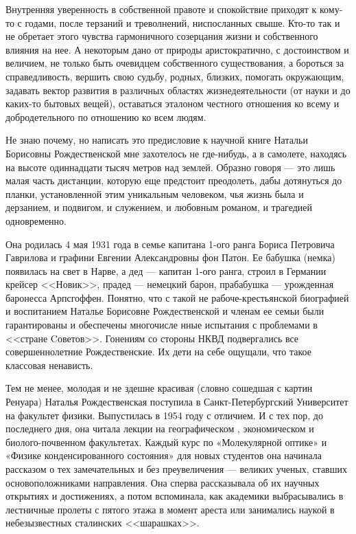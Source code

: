 ﻿\newpage
\vskip 10mm
\vskip 3mm 
\vskip 1cm

\pagestyle{empty}

\thispagestyle{empty}


Внутренняя уверенность в собственной правоте и спокойствие приходят к кому-то с годами, после терзаний и треволнений, ниспосланных свыше. Кто-то так и не обретает этого чувства гармоничного созерцания жизни и собственного влияния на нее. А некоторым дано от природы аристократично, с достоинством и величием, не только быть очевидцем собственного существования, а бороться за справедливость, вершить свою судьбу, родных, близких, помогать окружающим, задавать вектор развития в различных областях жизнедеятельности (от науки и до каких-то бытовых вещей), оставаться эталоном честного отношения ко всему и добродетельного по отношению ко всем людям.

Не знаю почему, но написать это предисловие к научной книге Натальи Борисовны Рождественской мне захотелось не где-нибудь, а в самолете, находясь на высоте одиннадцати тысяч метров над землей. Образно говоря --- это лишь малая часть дистанции, которую еще предстоит преодолеть, дабы дотянуться до планки, установленной этим уникальным человеком, чья жизнь была и дерзанием, и подвигом, и служением, и любовным романом, и трагедией одновременно.

Она родилась 4 мая 1931 года в семье капитана 1-ого ранга Бориса Петровича Гаврилова и графини Евгении Александровны фон Патон. Ее бабушка (немка) появилась на свет в Нарве, а дед --- капитан 1-ого ранга, строил в Германии крейсер <<Новик>>, прадед --- немецкий барон, прабабушка --- урожденная баронесса Арпсгоффен. Понятно, что с такой не рабоче-крестьянской биографией и воспитанием Наталье Борисовне Рождественской и членам ее семьи были гарантированы и обеспечены многочисле                                                       нные испытания с проблемами в <<стране Cоветов>>. Гонениям со стороны НКВД подвергались все совершеннолетние Рождественские. Их дети на себе ощущали, что такое классовая ненависть.

Тем не менее, молодая и не здешне красивая (словно сошедшая с картин Ренуара) Наталья Рождественская поступила в Санкт-Петербургский Университет на факультет физики. Выпустилась в 1954 году с отличием. И с тех пор, до последнего дня, она читала лекции на географическом , экономическом и биолого-почвенном факультетах. Каждый курс по «Молекулярной оптике» и «Физике конденсированного состояния» для новых студентов она начинала рассказом о тех замечательных и без преувеличения --- великих ученых, ставших основоположниками направления. Она сперва рассказывала об их научных открытиях и достижениях, а потом вспоминала, как академики выбрасывались в лестничные пролеты с пятого этажа в момент ареста или занимались наукой в небезызвестных сталинских <<шарашках>>.

